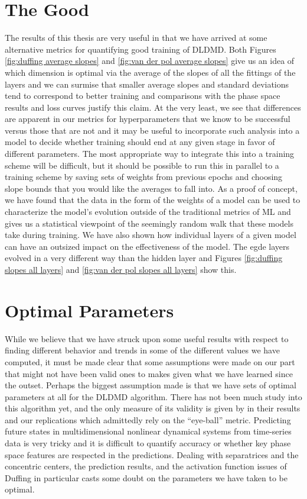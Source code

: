 \section{The Good}
The results of this thesis are very useful in that we have arrived at some alternative metrics for
quantifying good training of DLDMD. Both Figures \ref{fig:duffing average slopes} and \ref{fig:van 
der pol average slopes} give us an idea of which dimension is optimal via the average of the slopes
of all the fittings of the layers and we can surmise that smaller average slopes and standard deviations
tend to correspond to better training and comparisons with the phase space results and loss curves 
justify this claim. At the very least, we see that differences are apparent in our metrics for 
hyperparameters that we know to be successful versus those that are not and it may be useful to 
incorporate such analysis into a model to decide whether training should end at any given stage 
in favor of different parameters. The most appropriate way to integrate this into a training scheme 
will be difficult, but it should be possible to run this in parallel to a training scheme by saving
sets of weights from previous epochs and choosing slope bounds that you would like the averages to fall 
into. As a proof of concept, we have found that the data in the form of the weights of a model can be
used to characterize the model's evolution outside of the traditional metrics of ML and gives us a
statistical viewpoint of the seemingly random walk that these models take during training. We have also 
shown how individual layers of a given model can have an outsized impact on the effectiveness of the 
model. The egde layers evolved in a very different way than the hidden layer and Figures 
\ref{fig:duffing slopes all layers} and \ref{fig:van der pol slopes all layers} show this.


\section{Optimal Parameters}
While we believe that we have struck upon some useful results with respect to finding different behavior
and trends in some of the different values we have computed, it must be made clear that some assumptions
were made on our part that might not have been valid ones to makes given what we have learned since the 
outset. Perhaps the biggest assumption made is that 
we have sets of optimal parameters at all for the DLDMD algorithm. There has not been much study into this 
algorithm yet, and the only measure of its validity is given by \cite{lago} in their results and our 
replications which admittedly rely on the ``eye-ball'' metric. Predicting future states in multidimensional
nonlinear dynamical systems from time-series data is very tricky and it is difficult to quantify accuracy 
or whether key phase space features are respected in the predictions. Dealing with separatrices and 
the concentric centers, the prediction results, and the activation function issues of Duffing in 
particular casts some doubt on the parameters we have taken to be optimal. 

